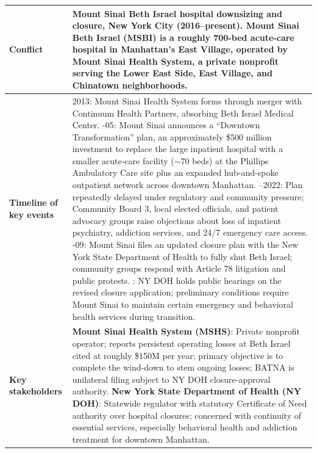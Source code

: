 \documentclass{llmxive}
\providecommand{\arraystretch}{1.1}
\begin{document}
\begin{table}[p]
\centering
\tiny
\renewcommand{\arraystretch}{1.15}
\begin{tabularx}{\textwidth}{@{}l X@{}}
\toprule
\textbf{Conflict} & Mount Sinai Beth Israel hospital downsizing and closure, New York City (2016--present). Mount Sinai Beth Israel (MSBI) is a roughly 700-bed acute-care hospital in Manhattan's East Village, operated by Mount Sinai Health System, a private nonprofit serving the Lower East Side, East Village, and Chinatown neighborhoods. \\
\midrule
\textbf{Timeline of key events} &
2013: Mount Sinai Health System forms through merger with Continuum Health Partners, absorbing Beth Israel Medical Center.
\newline
2016-05: Mount Sinai announces a ``Downtown Transformation'' plan, an approximately \$500 million investment to replace the large inpatient hospital with a smaller acute-care facility ($\sim$70 beds) at the Phillips Ambulatory Care site plus an expanded hub-and-spoke outpatient network across downtown Manhattan.
\newline
2016--2022: Plan repeatedly delayed under regulatory and community pressure; Community Board 3, local elected officials, and patient advocacy groups raise objections about loss of inpatient psychiatry, addiction services, and 24/7 emergency care access.
\newline
2023-09: Mount Sinai files an updated closure plan with the New York State Department of Health to fully shut Beth Israel; community groups respond with Article 78 litigation and public protests.
\newline
2024: NY DOH holds public hearings on the revised closure application; preliminary conditions require Mount Sinai to maintain certain emergency and behavioral health services during transition. \\
\midrule
\textbf{Key stakeholders} &
\textbf{Mount Sinai Health System (MSHS)}: Private nonprofit operator; reports persistent operating losses at Beth Israel cited at roughly \$150M per year; primary objective is to complete the wind-down to stem ongoing losses; BATNA is unilateral filing subject to NY DOH closure-approval authority.
\newline
\textbf{New York State Department of Health (NY DOH)}: Statewide regulator with statutory Certificate of Need authority over hospital closures; concerned with continuity of essential services, especially behavioral health and addiction treatment for downtown Manhattan.

\end{tabularx}
\end{table}
\end{document}

